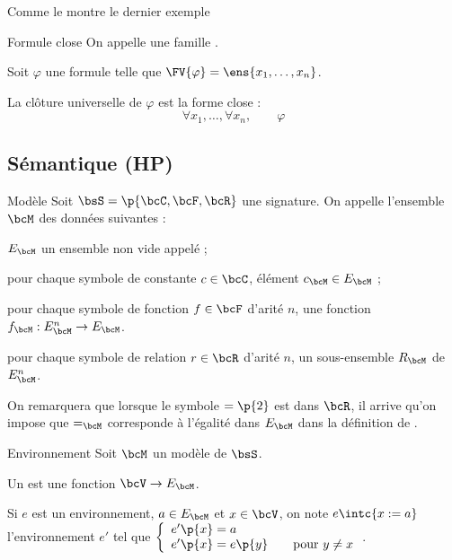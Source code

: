     \begin{warning}{}{}
        Comme le montre le dernier exemple 
    \end{warning}
    
    \begin{definition}{Formule close}{}
        On appelle  une famille .
    \end{definition}
    
    Soit $\varphi$ une formule telle que $\FV{\varphi} = \ens{x_1, \dots, x_n}$.
    
    La clôture universelle de $\varphi$ est la forme close :
    \[ \forall x_1, \dots, \forall x_n,\qquad \varphi\]
    
    \subsection{Sémantique (HP)}
    
    \begin{definition}{Modèle}{}
        Soit $\bsS = \p{\bcC, \bcF, \bcR}$ une signature.
        On appelle  l'ensemble $\bcM$ des données suivantes :
        \begin{enumerate}
            \itast $E_\bcM$ un ensemble non vide appelé  ;
            
            \itast pour chaque symbole de constante $c \in \bcC$,  élément $c_\bcM \in E_\bcM$ ;
            
            \itast pour chaque symbole de fonction $f \in \bcF$ d'arité $n$, une fonction $f_\bcM : E_\bcM^n \to E_\bcM$.
            
            \itast pour chaque symbole de relation $r \in \bcR$ d'arité $n$, un sous-ensemble $R_\bcM$ de $E_\bcM^n$.
        \end{enumerate}

    \end{definition}
    
    On remarquera que lorsque le symbole $= \p{2}$ est dans $\bcR$, il arrive qu'on impose que $=_\bcM$ corresponde à l'égalité dans $E_\bcM$ dans la définition de .
    
    \begin{definition}{Environnement}{}
        Soit $\bcM$ un modèle de $\bsS$.
        \begin{enumerate}
            \itast Un  est une fonction $\bcV \to E_\bcM$.
            
            \itast Si $e$ est un environnement, $a \in E_\bcM$ et $x \in \bcV$, on note $e\intc{x := a}$ l'environnement $e'$ tel que $\left\lbrace\begin{array}{ll}
                e'\p{x} = a  \\
                e'\p{x} = e\p{y} \qquad\text{pour} \ y \neq x
            \end{array}\right.$.
        \end{enumerate}
    \end{definition}
    
